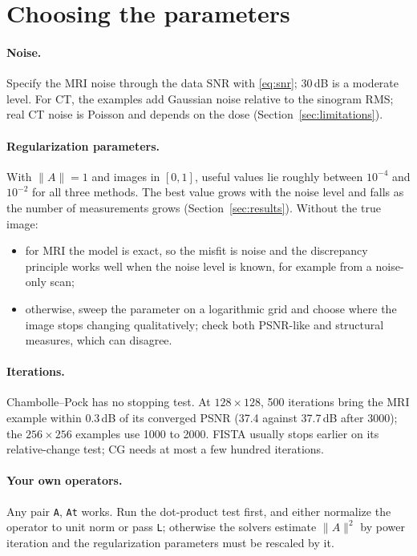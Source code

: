 \documentclass[11pt,a4paper]{article}
\newcommand{\code}[1]{\texttt{#1}}
\begin{document}
\section{Choosing the parameters}\label{sec:parameters}

\paragraph{Noise.} Specify the MRI noise through the data SNR with
\eqref{eq:snr}; 30\,dB is a moderate level. For CT, the examples add
Gaussian noise relative to the sinogram RMS; real CT noise is Poisson and
depends on the dose (Section~\ref{sec:limitations}).

\paragraph{Regularization parameters.} With $\|A\|=1$ and images in
$[0,1]$, useful values lie roughly between $10^{-4}$ and $10^{-2}$ for all
three methods. The best value grows with the noise level and falls as the
number of measurements grows (Section~\ref{sec:results}). Without the true
image:
\begin{itemize}
  \item for MRI the model is exact, so the misfit is noise and the
        discrepancy principle works well when the noise level is known, for
        example from a noise-only scan;
  \item otherwise, sweep the parameter on a logarithmic grid and choose
        where the image stops changing qualitatively; check both PSNR-like
        and structural measures, which can disagree.
\end{itemize}

\paragraph{Iterations.} Chambolle--Pock has no stopping test. At
$128\times128$, 500 iterations bring the MRI example within 0.3\,dB of its
converged PSNR (37.4 against 37.7\,dB after 3000); the $256\times256$
examples use 1000 to 2000. FISTA usually stops earlier on its relative-change test; CG
needs at most a few hundred iterations.

\paragraph{Your own operators.} Any pair \code{A}, \code{At} works. Run the
dot-product test first, and either normalize the operator to unit norm or
pass \code{L}; otherwise the solvers estimate $\|A\|^2$ by power iteration
and the regularization parameters must be rescaled by it.
\end{document}
